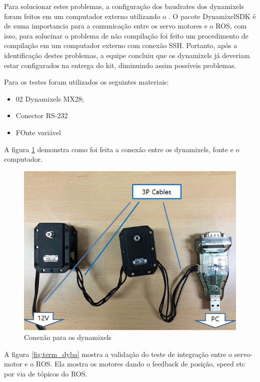 Para solucionar estes problemas, a configuração dos baudrates dos dynamixels foram feitos em um computador externo utilizando o \cite{mixcell}.
O pacote DynamixelSDK é de suma importancia para a comunicação entre os servo motores e o ROS, com isso, para solucinar o problema de não compilação foi feito um procedimento de compilação em um computador externo com conexão SSH.
Portanto, após a identificação destes problemas, a equipe concluiu que os dynamixels já deveriam estar configurados na entrega do kit, diminuindo assim possíveis problemas.

Para os testes foram utilizados os seguintes materiais:
\begin{itemize}
	\item 02 Dynamixels MX28;
	\item Conector RS-232
	\item FOnte variável
\end{itemize}

A figura \ref{fig:dyna_cone} demonstra como foi feita a conexão entre os dynamixels, fonte e o computador.
\begin{figure}[H]
	\centering
	\includegraphics[scale=0.8, angle=0]{Figures/dynamixel_conexao.png}
	\caption{Conexão para os dynamixels}
	\label{fig:dyna_cone}
\end{figure}

A figura \ref{fig:term_dyba} mostra a validação do teste de integração entre o servo-motor e o ROS. Ela mostra os motores dando o feedback de posição, speed etc por via de tópicos do ROS.

